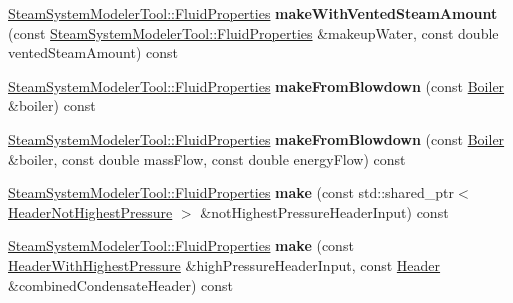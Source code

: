 \begin{DoxyCompactItemize}
\item 
\mbox{\label{class_fluid_properties_factory_aae22a8312f9eed7130e5178a1556a776}} 
\hyperlink{struct_steam_system_modeler_tool_1_1_fluid_properties}{Steam\+System\+Modeler\+Tool\+::\+Fluid\+Properties} {\bfseries make\+With\+Vented\+Steam\+Amount} (const \hyperlink{struct_steam_system_modeler_tool_1_1_fluid_properties}{Steam\+System\+Modeler\+Tool\+::\+Fluid\+Properties} \&makeup\+Water, const double vented\+Steam\+Amount) const
\item 
\mbox{\label{class_fluid_properties_factory_a8f695ab1e219c872a308598ef99d63d2}} 
\hyperlink{struct_steam_system_modeler_tool_1_1_fluid_properties}{Steam\+System\+Modeler\+Tool\+::\+Fluid\+Properties} {\bfseries make\+From\+Blowdown} (const \hyperlink{class_boiler}{Boiler} \&boiler) const
\item 
\mbox{\label{class_fluid_properties_factory_a29f4d516c2f7a4780b1acaec8d39f77f}} 
\hyperlink{struct_steam_system_modeler_tool_1_1_fluid_properties}{Steam\+System\+Modeler\+Tool\+::\+Fluid\+Properties} {\bfseries make\+From\+Blowdown} (const \hyperlink{class_boiler}{Boiler} \&boiler, const double mass\+Flow, const double energy\+Flow) const
\item 
\mbox{\label{class_fluid_properties_factory_a5eab55f93cb93ba11dc21b39c7ae20ef}} 
\hyperlink{struct_steam_system_modeler_tool_1_1_fluid_properties}{Steam\+System\+Modeler\+Tool\+::\+Fluid\+Properties} {\bfseries make} (const std\+::shared\+\_\+ptr$<$ \hyperlink{class_header_not_highest_pressure}{Header\+Not\+Highest\+Pressure} $>$ \&not\+Highest\+Pressure\+Header\+Input) const
\item 
\mbox{\label{class_fluid_properties_factory_a5abeba1ebc4f0c7f9d1eaf292b0e4abe}} 
\hyperlink{struct_steam_system_modeler_tool_1_1_fluid_properties}{Steam\+System\+Modeler\+Tool\+::\+Fluid\+Properties} {\bfseries make} (const \hyperlink{class_header_with_highest_pressure}{Header\+With\+Highest\+Pressure} \&high\+Pressure\+Header\+Input, const \hyperlink{class_header}{Header} \&combined\+Condensate\+Header) const
\item 
\mbox{\label{class_fluid_properties_factory_a846d99dff93d2cca276fc00e6d65143a}} 

\end{DoxyCompactItemize}
